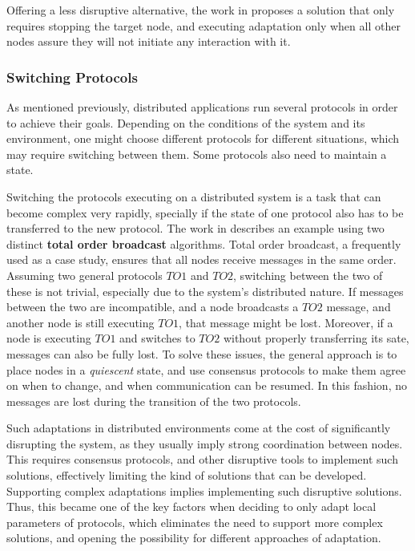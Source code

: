 Offering a less disruptive alternative, the work in \cite{Vandewoude2007} proposes a solution that only requires stopping the target node, and executing adaptation only when all other nodes assure they will not initiate any interaction with it.

\subsubsection{Switching Protocols}
\label{sssub:switchinprotocols}
As mentioned previously, distributed applications run several protocols in order to achieve their goals. Depending on the conditions of the system and its environment, one might choose different protocols for different situations, which may require switching between them. Some protocols also need to maintain a state.

Switching the protocols executing on a distributed system is a task that can become complex very rapidly, specially if the state of one protocol also has to be transferred to the new protocol. The work in \cite{Rosa2012} describes an example using two distinct \textbf{total order broadcast} algorithms. Total order broadcast,  a frequently used as a case study, ensures that all nodes receive messages in the same order. Assuming two general protocols $TO1$ and $TO2$, switching between the two of these is not trivial, especially due to the system's distributed nature. If messages between the two are incompatible, and a node broadcasts a $TO2$ message, and another node is still executing $TO1$, that message might be lost. Moreover, if a node is executing $TO1$ and switches to $TO2$ without properly transferring its sate, messages can also be fully lost. To solve these issues, the general approach is to place nodes in a \textit{quiescent} state, and use consensus protocols to make them agree on when to change, and when communication can be resumed. In this fashion, no messages are lost during the transition of the two protocols.

Such adaptations in distributed environments come at the cost of significantly disrupting the system, as they usually imply strong coordination between nodes. This requires consensus protocols, and other disruptive tools to implement such solutions, effectively limiting the kind of solutions that can be developed. Supporting complex adaptations implies implementing such disruptive solutions. Thus, this became one of the key factors when deciding to only adapt local parameters of protocols, which eliminates the need to support more complex solutions, and opening the possibility for different approaches of adaptation.

